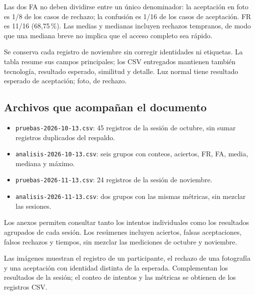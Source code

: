 Las dos FA no deben dividirse entre un único denominador: la aceptación en foto es 1/8 de los casos de rechazo; la confusión es 1/16 de los casos de aceptación. FR es 11/16 (68,75\,\%). Las medias y medianas incluyen rechazos tempranos, de modo que una mediana breve no implica que el acceso completo sea rápido.

Se conserva cada registro de noviembre sin corregir identidades ni etiquetas. La tabla resume sus campos principales; los CSV entregados mantienen también tecnología, resultado esperado, similitud y detalle. Luz normal tiene resultado esperado de aceptación; foto, de rechazo.
\begin{center}\small\singlespacing

\end{center}

\subsection{Archivos que acompañan el documento}
\begin{itemize}
\item \texttt{pruebas-2026-10-13.csv}: 45 registros de la sesión de octubre, sin sumar registros duplicados del respaldo.
\item \texttt{analisis-2026-10-13.csv}: seis grupos con conteos, aciertos, FR, FA, media, mediana y máximo.
\item \texttt{pruebas-2026-11-13.csv}: 24 registros de la sesión de noviembre.
\item \texttt{analisis-2026-11-13.csv}: dos grupos con las mismas métricas, sin mezclar las sesiones.
\end{itemize}
Los anexos permiten consultar tanto los intentos individuales como los resultados agrupados de cada sesión. Los resúmenes incluyen aciertos, falsas aceptaciones, falsos rechazos y tiempos, sin mezclar las mediciones de octubre y noviembre.

Las imágenes muestran el registro de un participante, el rechazo de una fotografía y una aceptación con identidad distinta de la esperada. Complementan los resultados de la sesión; el conteo de intentos y las métricas se obtienen de los registros CSV.

